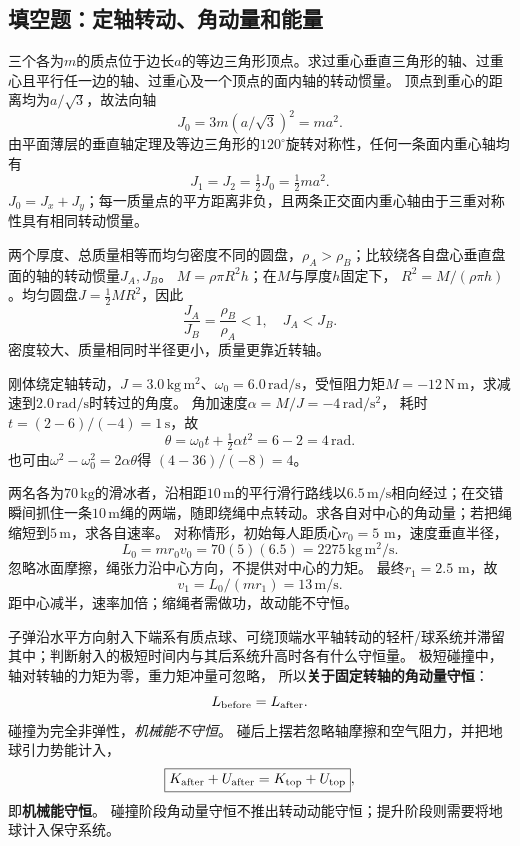 \subsection{填空题：定轴转动、角动量和能量}

\problemtext 三个各为$m$的质点位于边长$a$的等边三角形顶点。求过重心垂直三角形的轴、过重心且平行任一边的轴、过重心及一个顶点的面内轴的转动惯量。
\workings
顶点到重心的距离均为$a/\sqrt3$，故法向轴
\[
\boxed{J_0=3m(a/\sqrt3)^2=ma^2}.
\]
由平面薄层的垂直轴定理及等边三角形的$120^\circ$旋转对称性，任何一条面内重心轴均有
\[
\boxed{J_1=J_2=\tfrac12J_0=\tfrac12ma^2}.
\]
\crosscheck $J_0=J_x+J_y$；每一质量点的平方距离非负，且两条正交面内重心轴由于三重对称性具有相同转动惯量。

\problemtext 两个厚度、总质量相等而均匀密度不同的圆盘，$\rho_A>\rho_B$；比较绕各自盘心垂直盘面的轴的转动惯量$J_A,J_B$。
\workings
$M=\rho\pi R^2h$；在$M$与厚度$h$固定下，
$R^2=M/(\rho\pi h)$。均匀圆盘$J=\frac12MR^2$，因此
\[
\frac{J_A}{J_B}=\frac{\rho_B}{\rho_A}<1,
\quad \boxed{J_A<J_B}.
\]
\crosscheck 密度较大、质量相同时半径更小，质量更靠近转轴。

\problemtext 刚体绕定轴转动，$J=3.0\,\mathrm{kg\,m^2}$、$\omega_0=6.0\,\mathrm{rad/s}$，受恒阻力矩$M=-12\,\mathrm{N\,m}$，求减速到$2.0\,\mathrm{rad/s}$时转过的角度。
\workings
角加速度$\alpha=M/J=-4\,\mathrm{rad/s^2}$，
耗时$t=(2-6)/(-4)=1\,\mathrm s$，故
\[
\boxed{\theta=\omega_0t+\tfrac12\alpha t^2
=6-2=4\,\mathrm{rad}}.
\]
\crosscheck 也可由$\omega^2-\omega_0^2=2\alpha\theta$得
$(4-36)/(-8)=4$。

\problemtext 两名各为$70\,\mathrm{kg}$的滑冰者，沿相距$10\,\mathrm m$的平行滑行路线以$6.5\,\mathrm{m/s}$相向经过；在交错瞬间抓住一条$10\,\mathrm m$绳的两端，随即绕绳中点转动。求各自对中心的角动量；若把绳缩短到$5\,\mathrm m$，求各自速率。
\workings
对称情形，初始每人距质心$r_0=5$ m，速度垂直半径，
\[
\boxed{L_0=mr_0v_0=70(5)(6.5)=2275\,\mathrm{kg\,m^2/s}}.
\]
忽略冰面摩擦，绳张力沿中心方向，不提供对中心的力矩。
最终$r_1=2.5$ m，故
\[
\boxed{v_1=L_0/(mr_1)=13\,\mathrm{m/s}}.
\]
\crosscheck 距中心减半，速率加倍；缩绳者需做功，故动能不守恒。

\problemtext 子弹沿水平方向射入下端系有质点球、可绕顶端水平轴转动的轻杆/球系统并滞留其中；判断射入的极短时间内与其后系统升高时各有什么守恒量。
\workings
极短碰撞中，轴对转轴的力矩为零，重力矩冲量可忽略，
所以\textbf{关于固定转轴的角动量守恒}：
\[
L_{\rm before}=L_{\rm after}.
\]
碰撞为完全非弹性，\emph{机械能不守恒}。
碰后上摆若忽略轴摩擦和空气阻力，并把地球引力势能计入，
\[
\boxed{K_{\rm after}+U_{\rm after}=K_{\rm top}+U_{\rm top}},
\]
即\textbf{机械能守恒}。
\crosscheck 碰撞阶段角动量守恒不推出转动动能守恒；提升阶段则需要将地球计入保守系统。

